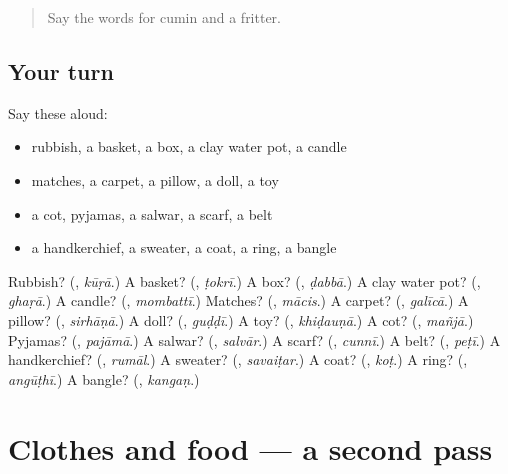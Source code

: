 \label{lesson:PA-R125-first-pass-the-house-and-clothes}



\begin{quote}
Say the words for cumin and a fritter.
\end{quote}

\subsection*{Your turn}
Say these aloud:

\begin{itemize}
\raggedright
  \item rubbish, a basket, a box, a clay water pot, a candle
  \item matches, a carpet, a pillow, a doll, a toy
  \item a cot, pyjamas, a salwar, a scarf, a belt
  \item a handkerchief, a sweater, a coat, a ring, a bangle
\end{itemize}

\begin{tcolorbox}[breakable,colback=teal!4,colframe=teal!35!black,title={Before you move on}]
Rubbish? (\textbf{}, \emph{kūṛā}.) A basket? (\textbf{}, \emph{ṭokrī}.) A box? (\textbf{}, \emph{ḍabbā}.) A clay water pot? (\textbf{}, \emph{ghaṛā}.) A candle? (\textbf{}, \emph{mombattī}.) Matches? (\textbf{}, \emph{mācis}.) A carpet? (\textbf{}, \emph{galīcā}.) A pillow? (\textbf{}, \emph{sirhāṇā}.) A doll? (\textbf{}, \emph{guḍḍī}.) A toy? (\textbf{}, \emph{khiḍauṇā}.) A cot? (\textbf{}, \emph{mañjā}.) Pyjamas? (\textbf{}, \emph{pajāmā}.) A salwar? (\textbf{}, \emph{salvār}.) A scarf? (\textbf{}, \emph{cunnī}.) A belt? (\textbf{}, \emph{peṭī}.) A handkerchief? (\textbf{}, \emph{rumāl}.) A sweater? (\textbf{}, \emph{savaiṭar}.) A coat? (\textbf{}, \emph{koṭ}.) A ring? (\textbf{}, \emph{angūṭhī}.) A bangle? (\textbf{}, \emph{kangaṇ}.)
\end{tcolorbox}
\section[(dialogue)]{Clothes and food — a second pass}

\label{lesson:PA-R125-second-pass-clothes-and-food}



